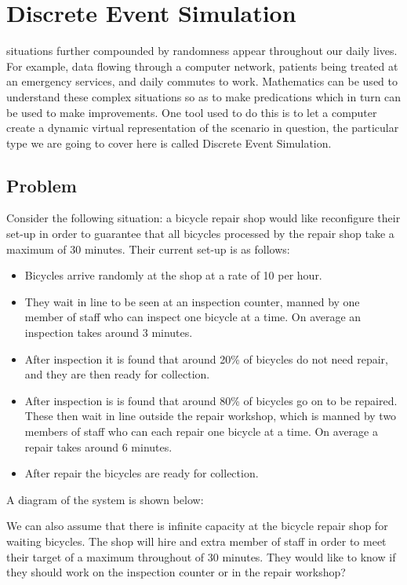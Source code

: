 \chapter[Discrete Event Simulation]{Discrete Event Simulation}

 situations further compounded by randomness appear
throughout our daily lives. For example, data flowing through a computer
network, patients being treated at an emergency services, and daily commutes to
work.
Mathematics can be used to understand these complex situations so as to
make predications which in turn can be used to make improvements. One tool used
to do this is to let a computer create a dynamic virtual representation of the
scenario in question, the particular type we are going to cover here is called
Discrete Event Simulation.

\section{Problem}\label{sec:problem}

Consider the following situation: a bicycle repair shop would like reconfigure
their set-up in order to guarantee that all bicycles processed by the repair
shop take a maximum of 30 minutes.
Their current set-up is as follows:

\begin{itemize}
  \item Bicycles arrive randomly at the shop at a rate of 10 per hour.
  \item They wait in line to be seen at an inspection counter, manned by one
  member of staff who can inspect one bicycle at a time. On average an
  inspection takes around 3 minutes.
  \item After inspection it is found that around 20\% of bicycles do not need
  repair, and they are then ready for collection.
  \item After inspection is is found that around 80\% of bicycles go on to be
  repaired. These then wait in line outside the repair workshop, which is manned
  by two members of staff who can each repair one bicycle at a time. On average
  a repair takes around 6 minutes.
  \item After repair the bicycles are ready for collection.
\end{itemize}

A diagram of the system is shown below:

We can also assume that there is infinite capacity at the bicycle repair shop
for waiting bicycles.
The shop will hire and extra member of staff in order to meet their target of a
maximum throughout of 30 minutes. They would like to know if they should work on
the inspection counter or in the repair workshop?


